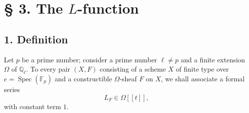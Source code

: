\documentclass[11pt]{article}
\DeclareMathOperator{\Spec}{Spec}
\providecommand{\Spec}{\operatorname{Spec}}
\providecommand{\Spec}{\operatorname{Spec}}
\providecommand{\Spec}{\operatorname{Spec}}
\providecommand{\Spec}{\operatorname{Spec}}
\begin{document}
\section*{§ 3. The $L$-function}

\subsection*{1. Definition}

Let $p$ be a prime number; consider a prime number $\ell\ne p$ and a finite extension $\Omega$ of $\mathbb Q_\ell$. To every pair $(X,F)$ consisting of a scheme $X$ of finite type over $e=\Spec(\mathbb F_p)$ and a constructible $\Omega$-sheaf $F$ on $X$, we shall associate a formal series
\[
L_F\in\Omega[[t]],
\]
with constant term $1$.
\end{document}
